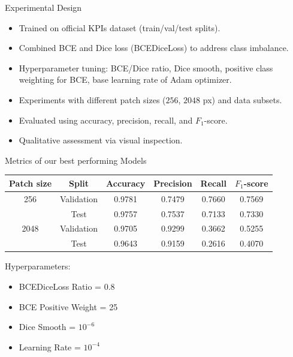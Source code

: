 \documentclass{beamer}
\begin{document}
\begin{frame}{Experimental Design}
    \begin{itemize}
        \item Trained on official KPIs dataset (train/val/test splits).
        \item Combined BCE and Dice loss (BCEDiceLoss) to address class imbalance. 
        \item Hyperparameter tuning: BCE/Dice ratio, Dice smooth, positive class weighting for BCE, base learning rate of Adam optimizer.
        \item Experiments with different patch sizes ($256$, $2048$ px) and data subsets.
        \item Evaluated using accuracy, precision, recall, and $F_1$-score.
        \item Qualitative assessment via visual inspection.
    \end{itemize}
\end{frame}

\begin{frame}{Metrics of our best performing Models}
    \begin{table}[t]
        \centering
        \begin{tabular}{c|c|cccc}
            \toprule
            Patch size & Split & Accuracy & Precision & Recall & $F_1$-score \\
            \midrule
            256 & Validation & 0.9781 & 0.7479 & 0.7660 & 0.7569 \\
            & Test       & 0.9757 & 0.7537 & 0.7133 & 0.7330 \\
            \midrule
            2048 & Validation & 0.9705 & 0.9299 & 0.3662 & 0.5255 \\
            & Test       & 0.9643 & 0.9159 & 0.2616 & 0.4070 \\
            \bottomrule
        \end{tabular}
    \end{table}
    \begin{block}{Hyperparameters:}
        \begin{itemize}
            \item BCEDiceLoss Ratio = 0.8
            \item BCE Positive Weight = 25
            \item Dice Smooth = $10^{-6}$
            \item Learning Rate = $10^{-4}$
        \end{itemize}
    \end{block}
\end{frame}
\end{document}
